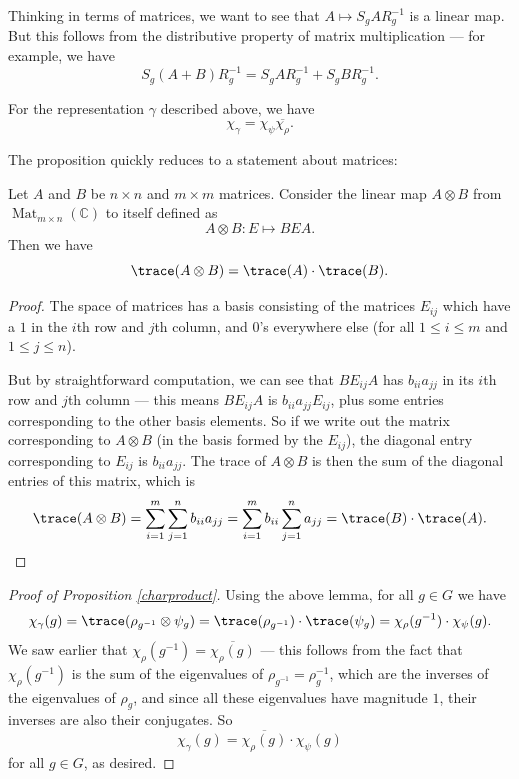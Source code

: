 \begin{ans}
Thinking in terms of matrices, we want to see that $A \mapsto S_gAR_g^{-1}$ is a linear map. But this follows from the distributive property of matrix multiplication --- for example, we have \[S_g(A + B)R_g^{-1} = S_gAR_g^{-1} + S_gBR_g^{-1}.\] 
\end{ans}

\begin{proposition} \label{charproduct}
    For the representation $\gamma$ described above, we have \[\chi_{\gamma} = \chi_\psi \overline{\chi_\rho}.\] 
\end{proposition}

The proposition quickly reduces to a statement about matrices:

\begin{lemma}
    Let $A$ and $B$ be $n \times n$ and $m \times m$ matrices. Consider the linear map $A \otimes B$ from $\operatorname{Mat}_{m\times n}(\mathbb{C})$ to itself defined as \[A \otimes B : E \mapsto BEA.\] Then we have \[\trace(A\otimes B) = \trace(A) \cdot \trace(B).\] 
\end{lemma}

\begin{proof}
    The space of matrices has a basis consisting of the matrices $E_{ij}$ which have a $1$ in the $i$th row and $j$th column, and $0$'s everywhere else (for all $1 \leq i \leq m$ and $1 \leq j \leq n$).
    
    But by straightforward computation, we can see that $BE_{ij}A$ has $b_{ii}a_{jj}$ in its $i$th row and $j$th column --- this means $BE_{ij}A$ is $b_{ii}a_{jj}E_{ij}$, plus some entries corresponding to the other basis elements. So if we write out the matrix corresponding to $A \otimes B$ (in the basis formed by the $E_{ij}$), the diagonal entry corresponding to $E_{ij}$ is $b_{ii}a_{jj}$. The trace of $A \otimes B$ is then the sum of the diagonal entries of this matrix, which is \[\trace(A \otimes B) = \sum_{i = 1}^m \sum_{j = 1}^n b_{ii}a_{jj} = \sum_{i = 1}^m b_{ii} \sum_{j = 1}^n a_{jj} = \trace(B)\cdot \trace(A). \qedhere\] 
\end{proof}

\begin{proof}[Proof of Proposition \ref{charproduct}] 
    Using the above lemma, for all $g \in G$ we have \[\chi_{\gamma}(g) = \trace(\rho_{g^{-1}} \otimes \psi_g) = \trace(\rho_{g^{-1}})\cdot \trace(\psi_g) = \chi_\rho(g^{-1})\cdot \chi_\psi(g).\] We saw earlier that $\chi_\rho(g^{-1}) = \overline{\chi_\rho(g)}$ --- this follows from the fact that $\chi_\rho(g^{-1})$ is the sum of the eigenvalues of $\rho_{g^{-1}} = \rho_g^{-1}$, which are the inverses of the eigenvalues of $\rho_g$, and since all these eigenvalues have magnitude $1$, their inverses are also their conjugates. So \[\chi_\gamma(g) = \overline{\chi_\rho(g)} \cdot \chi_\psi(g)\] for all $g \in G$, as desired. 
\end{proof}

